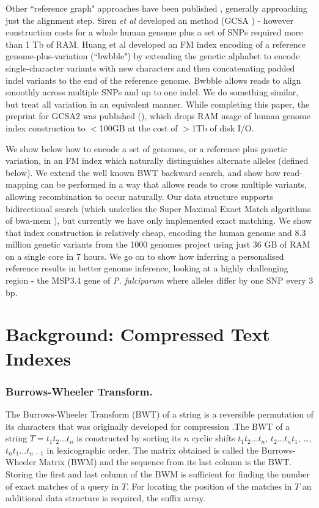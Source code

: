 \documentclass[runningheads,a4paper]{llncs}
\begin{document}
Other ``reference graph" approaches have been published \cite{korbinian,siren1,huang}, generally approaching just the alignment step.  Siren \textit{et al} developed an  method (GCSA \cite{siren1}) - however construction costs for a whole human genome plus a set of SNPs required more than 1 Tb of RAM. Huang et al \cite{huang} developed an FM index encoding of a reference genome-plus-variation (``bwbble") by extending the genetic alphabet to encode single-character variants with new characters and then concatenating padded indel variants to the end of the reference genome. Bwbble allows reads to align smoothly across multiple SNPs and up to one indel. We do something similar, but treat all variation in an equivalent manner.  While completing this paper, the preprint for GCSA2 was published (\cite{siren2}), which drops RAM usage of human genome index construction to $<$100GB at the cost of $>$1Tb of disk I/O.   

 We show below how to encode a set of genomes, or a reference plus  genetic variation, in an FM index which naturally distinguishes alternate alleles (defined below). We extend the well known  BWT backward search, and show how read-mapping can be performed in a way that allows reads to cross multiple variants, allowing recombination to occur naturally. Our data structure  supports bidirectional search (which underlies the Super Maximal Exact Match algorithms of bwa-mem \cite{bwa}), but currently we have only implemented exact matching. We show that index construction is relatively cheap, encoding the human genome and 8.3 million genetic variants from the 1000 genomes project using just 36 GB of RAM on a single core in 7 hours. We go on to show how inferring a personalised reference results in better genome inference, looking at a highly challenging region - the MSP3.4 gene of \textit{P. falciparum} where alleles differ by one SNP every 3 bp.  


\section{Background: Compressed Text Indexes}

\subsubsection{Burrows-Wheeler Transform.}
The Burrows-Wheeler Transform (BWT) of a string is a reversible permutation of its characters that was originally developed for compression \cite{bwt}.The BWT of a string $T=t_1t_2 \ldots t_n$ is constructed by sorting its $n$ cyclic shifts $t_1t_2 \ldots t_n$, $t_2 \ldots t_n t_1$, \ldots,  $t_n t_1 \ldots t_{n-1}$ in lexicographic order. The matrix obtained is called the Burrows-Wheeler Matrix (BWM) and the sequence from its last column is the BWT. Storing the first and last column of the BWM is sufficient for finding the number of exact matches of a query in $T$. For locating the position of the matches in $T$ an additional data structure is required, the suffix array. 
\end{document}
